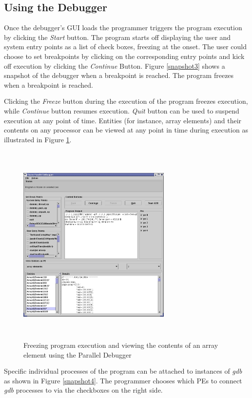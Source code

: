 \documentclass[10pt]{article}
\begin{document}
\subsection{Using the Debugger}


Once the debugger's GUI loads the programmer triggers the program
execution by clicking the \textit{Start} button.  The program starts
off displaying the user and system entry points as a list of check
boxes, freezing at the onset. The user could choose to set breakpoints
by clicking on the corresponding entry points and kick off execution
by clicking the \textit{Continue} Button. Figure \ref{snapshot3} shows
a snapshot of the debugger when a breakpoint is reached. The program
freezes when a breakpoint is reached.

 
Clicking the \textit{Freeze} button during the execution of the program freezes execution, while
\textit{Continue} button resumes execution. \textit{Quit} button can be used to suspend execution
at any point of time. Entities (for instance, array elements) and their contents on any processor 
can be viewed at any point in time during execution as illustrated in Figure \ref{arrayelement}.

\begin{figure}[]
\includegraphics[scale=0.5, height=4in,width=3in]{figs/arrayelement}
\caption{Freezing program execution and viewing the contents of an array element using the Parallel Debugger}
\label{arrayelement}
\end{figure} 

Specific individual processes of the \charmpp{} program can be attached to instances of \textit{gdb} 
as shown in Figure \ref{snapshot4}.  The programmer chooses which PEs to connect \textit{gdb} processes to via the checkboxes on the right side.  
\end{document}
